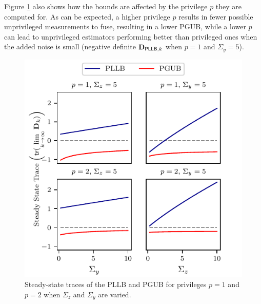 \documentclass[letterpaper, 10 pt, conference]{ieeeconf}
\begin{document}
Figure \ref{fig:trace_params} also shows how the bounds are affected by the privilege $p$ they are computed for. As can be expected, a higher privilege $p$ results in fewer possible unprivileged measurements to fuse, resulting in a lower PGUB, while a lower $p$ can lead to unprivileged estimators performing better than privileged ones when the added noise is small (negative definite ${{\mathbf{D}}}_{\mathsf{PLLB},k}$ when $p=1$ and $\Sigma_y=5$).
\begin{figure}[htbp]
  \centering
  \includegraphics{figures/trace_params.pdf}
  \caption{Steady-state traces of the PLLB and PGUB for privileges $p=1$ and $p=2$ when $\Sigma_z$ and $\Sigma_y$ are varied.}
  \label{fig:trace_params}
\end{figure}

% 
%                                               
%                                               
%                                               
% 
\end{document}

